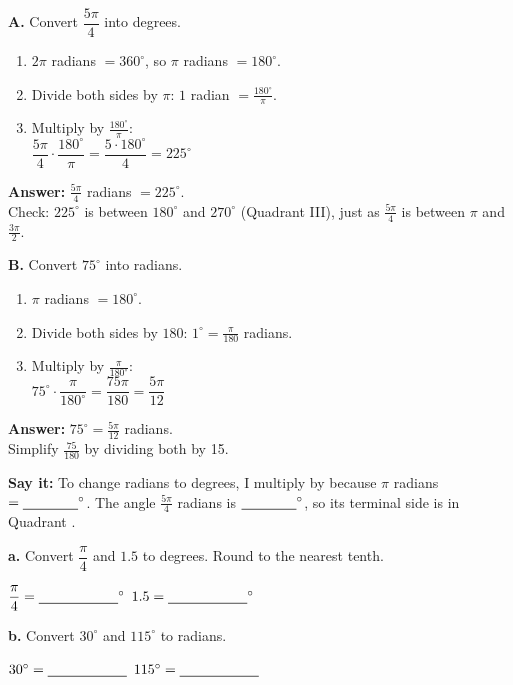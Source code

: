 \vspace{4pt}
\begin{minipage}[t]{0.48\textwidth}
\textbf{A.} Convert $\dfrac{5\pi}{4}$ into degrees.
\begin{enumerate}[label=\arabic*.]
\item $2\pi$ radians $=360^\circ$, so $\pi$ radians $=180^\circ$.
\item Divide both sides by $\pi$: $1$ radian $=\tfrac{180^\circ}{\pi}$.
\item Multiply by $\tfrac{180^\circ}{\pi}$:\\[3pt]
$\dfrac{5\pi}{4}\cdot\dfrac{180^\circ}{\pi}=\dfrac{5\cdot180^\circ}{4}=225^\circ$
\end{enumerate}
\textbf{Answer:} $\tfrac{5\pi}{4}$ radians $=225^\circ$.\\
{\small Check: $225^\circ$ is between $180^\circ$ and $270^\circ$ (Quadrant III), just as $\tfrac{5\pi}{4}$ is between $\pi$ and $\tfrac{3\pi}{2}$.}
\end{minipage}\hfill
\begin{minipage}[t]{0.48\textwidth}
\textbf{B.} Convert $75^\circ$ into radians.
\begin{enumerate}[label=\arabic*.]
\item $\pi$ radians $=180^\circ$.
\item Divide both sides by $180$: $1^\circ=\tfrac{\pi}{180}$ radians.
\item Multiply by $\tfrac{\pi}{180^\circ}$:\\[3pt]
$75^\circ\cdot\dfrac{\pi}{180^\circ}=\dfrac{75\pi}{180}=\dfrac{5\pi}{12}$
\end{enumerate}
\textbf{Answer:} $75^\circ=\tfrac{5\pi}{12}$ radians.\\
{\small Simplify $\tfrac{75}{180}$ by dividing both by 15.}
\end{minipage}

\vspace{4pt}
\textbf{Say it:} To change radians to degrees, I multiply by \blank[1.6cm] because $\pi$ radians $=\blank[1.4cm]^\circ$. The angle $\frac{5\pi}{4}$ radians is $\blank[1.4cm]^\circ$, so its terminal side is in Quadrant \blank[1cm].\lines[1]

\begin{minipage}[t]{0.48\textwidth}
\textbf{a.} Convert $\dfrac{\pi}{4}$ and $1.5$ to degrees. Round to the nearest tenth.

\vspace{4pt}
$\dfrac{\pi}{4}=\blank[2cm]^\circ$ \qquad $1.5=\blank[2cm]^\circ$
\lines[4]
\end{minipage}\hfill
\begin{minipage}[t]{0.48\textwidth}
\textbf{b.} Convert $30^\circ$ and $115^\circ$ to radians.

\vspace{4pt}
$30^\circ=\blank[2cm]$ \qquad $115^\circ=\blank[2cm]$
\lines[4]
\end{minipage}

